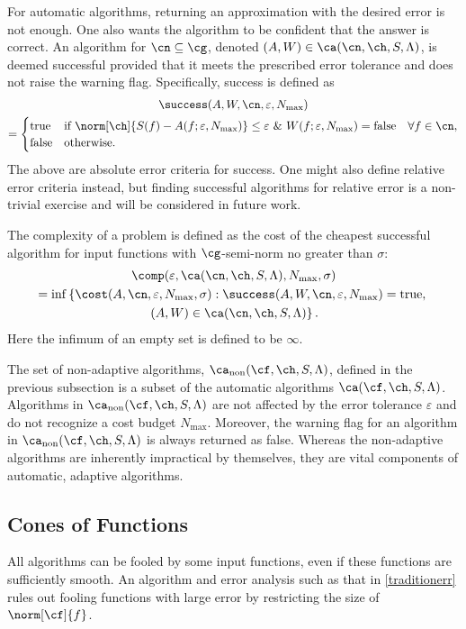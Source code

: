 \documentclass[]{elsarticle}
\DeclareMathOperator{\fix}{non}
\theoremstyle{definition}
\theoremstyle{remark}
\begin{document}
For automatic algorithms, returning an approximation with the desired error is not enough.  One also wants the algorithm to be confident that the answer is correct.  An  algorithm for $\cn \subseteq \cg$, denoted $(A,W) \in \ca(\cn,\ch,S,\Lambda)$, is deemed successful provided that it meets the prescribed error tolerance and does not raise the warning flag.  Specifically, success is defined as
\begin{multline*}
\success(A,W,\cn,\varepsilon,N_{\max}) \\
= \begin{cases} \text{true} & \text{if } \displaystyle \norm[\ch]{S(f)-A(f;\varepsilon,N_{\max})} \le \varepsilon \ \& \ W(f;\varepsilon,N_{\max})=\text{false} \quad \forall  f \in \cn, \\
\displaystyle \text{false} & \text{otherwise}.
\end{cases}
\end{multline*}
The above are absolute error criteria for success.  One might also define relative error criteria instead, but finding successful algorithms for relative error is a non-trivial exercise and will be considered in future work.

The complexity of a problem is defined as the cost of the cheapest successful algorithm for input functions with $\cg$-semi-norm no greater than $\sigma$:
\begin{multline} \label{complexdef}
\comp(\varepsilon,\ca(\cn,\ch,S,\Lambda),N_{\max},\sigma) \\
 = \inf\left\{\cost(A,\cn,\varepsilon,N_{\max},\sigma) : \success(A,W,\cn,\varepsilon,N_{\max}) = \text{true}, \right .\\
\left.  (A,W) \in \ca(\cn,\ch,S,\Lambda) \right \}.
\end{multline}
Here the infimum of an empty set is defined to be $\infty$.

The set of non-adaptive algorithms, $\ca_{\fix}(\cf,\ch,S,\Lambda)$, defined in the previous subsection is a subset of the automatic algorithms $\ca(\cf,\ch,S,\Lambda)$.  Algorithms in $\ca_{\fix}(\cf,\ch,S,\Lambda)$ are not affected by the error tolerance $\varepsilon$ and do not recognize a cost budget $N_{\max}$.  Moreover, the warning flag for an algorithm in $\ca_{\fix}(\cf,\ch,S,\Lambda)$ is always returned as false.  Whereas the non-adaptive algorithms are inherently impractical by themselves, they are vital components of automatic, adaptive algorithms.

\subsection{Cones of Functions} \label{conesubsec} All algorithms can be fooled by some input functions, even if these functions are sufficiently smooth.  An algorithm and error analysis such as that in \eqref{traditionerr} rules out fooling functions with large error by restricting the size of  $\norm[\cf]{f}$.  
\end{document}
